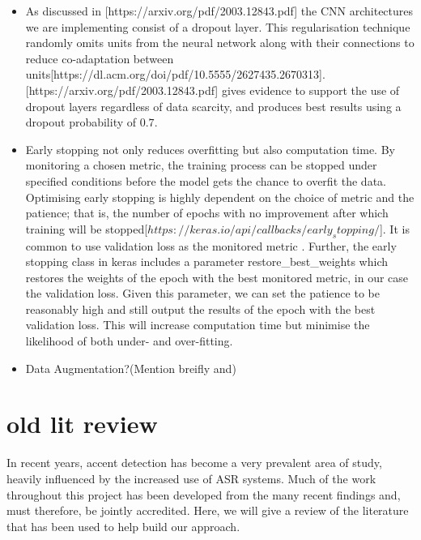 \documentclass[11pt,a4paper,twoside]{article}
\begin{document}
\begin{itemize}
    \item As discussed in [https://arxiv.org/pdf/2003.12843.pdf] the CNN architectures we are implementing consist of a dropout layer. This regularisation technique randomly omits units from the neural network along with their connections to reduce co-adaptation between units[https://dl.acm.org/doi/pdf/10.5555/2627435.2670313]. [https://arxiv.org/pdf/2003.12843.pdf] gives evidence to support the use of dropout layers regardless of data scarcity, and produces best results using a dropout probability of $0.7$.
    
    \item Early stopping not only reduces overfitting but also computation time. By monitoring a chosen metric, the training process can be stopped under specified conditions before the model gets the chance to overfit the data. Optimising early stopping is highly dependent on the choice of metric and the patience; that is, the number of epochs with no improvement after which training will be stopped[$https://keras.io/api/callbacks/early_stopping/$]. It is common to use validation loss as the monitored metric . Further, the early stopping class in keras includes a parameter restore\_best\_weights which restores the weights of the epoch with the best monitored metric, in our case the validation loss. Given this parameter, we can set the patience to be reasonably high and still output the results of the epoch with the best validation loss. This will increase computation time but minimise the likelihood of both under- and over-fitting.
    
    \item Data Augmentation?(Mention breifly and)
\end{itemize}

\section{old lit review}

In recent years, accent detection has become a very prevalent area of study, heavily influenced by the increased use of ASR systems. Much of the work throughout this project has been developed from the many recent findings and, must therefore, be jointly accredited. Here, we will give a review of the literature that has been used to help build our approach.
\end{document}

